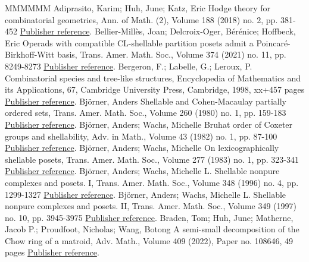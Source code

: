 \begin{thebibliography}{MMMMMM}
 Adiprasito, Karim; Huh, June; Katz, Eric Hodge theory for combinatorial geometries, Ann. of Math. (2), Volume 188 (2018) no. 2, pp. 381-452 \href{https://alco.centre-mersenne.org/articles/10.5802/alco.455/#AdiprasitoHuhKatz2018}{Publisher reference}.
 Bellier-Millès, Joan; Delcroix-Oger, Bérénice; Hoffbeck, Eric Operads with compatible CL-shellable partition posets admit a Poincaré-Birkhoff-Witt basis, Trans. Amer. Math. Soc., Volume 374 (2021) no. 11, pp. 8249-8273 \href{https://alco.centre-mersenne.org/articles/10.5802/alco.455/#BelliermillesDelcroixogerHoffbeck2021}{Publisher reference}.
 Bergeron, F.; Labelle, G.; Leroux, P. Combinatorial species and tree-like structures, Encyclopedia of Mathematics and its Applications, 67, Cambridge University Press, Cambridge, 1998, xx+457 pages \href{https://alco.centre-mersenne.org/articles/10.5802/alco.455/#BergeronLabelleLeroux1998}{Publisher reference}.
 Björner, Anders Shellable and Cohen-Macaulay partially ordered sets, Trans. Amer. Math. Soc., Volume 260 (1980) no. 1, pp. 159-183 \href{https://alco.centre-mersenne.org/articles/10.5802/alco.455/#Bjorner1980}{Publisher reference}.
 Björner, Anders; Wachs, Michelle Bruhat order of Coxeter groups and shellability, Adv. in Math., Volume 43 (1982) no. 1, pp. 87-100 \href{https://alco.centre-mersenne.org/articles/10.5802/alco.455/#BjornerWachs1982}{Publisher reference}.
 Björner, Anders; Wachs, Michelle On lexicographically shellable posets, Trans. Amer. Math. Soc., Volume 277 (1983) no. 1, pp. 323-341 \href{https://alco.centre-mersenne.org/articles/10.5802/alco.455/#BjornerWachs1983}{Publisher reference}.
 Björner, Anders; Wachs, Michelle L. Shellable nonpure complexes and posets. I, Trans. Amer. Math. Soc., Volume 348 (1996) no. 4, pp. 1299-1327 \href{https://alco.centre-mersenne.org/articles/10.5802/alco.455/#BjornerWachs1996}{Publisher reference}.
 Björner, Anders; Wachs, Michelle L. Shellable nonpure complexes and posets. II, Trans. Amer. Math. Soc., Volume 349 (1997) no. 10, pp. 3945-3975 \href{https://alco.centre-mersenne.org/articles/10.5802/alco.455/#BjornerWachs1997}{Publisher reference}.
 Braden, Tom; Huh, June; Matherne, Jacob P.; Proudfoot, Nicholas; Wang, Botong A semi-small decomposition of the Chow ring of a matroid, Adv. Math., Volume 409 (2022), Paper no. 108646, 49 pages \href{https://alco.centre-mersenne.org/articles/10.5802/alco.455/#BradenHuhMatherneProudfootWang2022}{Publisher reference}.

\end{thebibliography}
